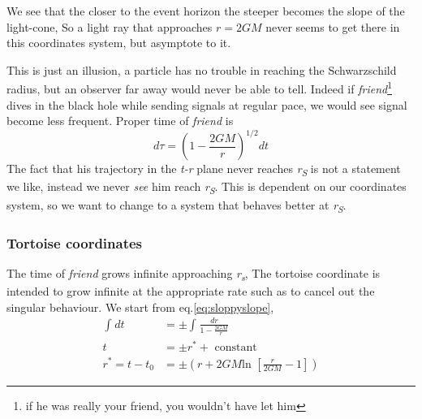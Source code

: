 \bigskip


We see that the closer to the event horizon the steeper becomes the slope of the light-cone, So a light ray that approaches $r=2GM$ never seems to get there in this coordinates system, but asymptote to it. \par
This is just an illusion, a particle has no trouble in reaching the Schwarzschild radius, but an observer far away would never be able to tell. Indeed if \emph{friend}\footnote{if he was really your friend, you wouldn't have let him} dives in the black hole while sending signals at regular pace, we would see signal become less frequent. Proper time of \emph{friend} is
\[
d\tau = \left( 1 - \frac{2GM}{r} \right)^{1/2}dt
\]
The fact that his trajectory in the \emph{t-r} plane never reaches \emph{r\textsubscript{S}} is not a statement we like, instead we never \emph{see} him reach \emph{r\textsubscript{S}}. This is dependent on our coordinates system, so we want to change to a system that behaves better at \emph{r\textsubscript{S}}.
\subsubsection{Tortoise coordinates}
The time of \emph{friend} grows infinite approaching \emph{r\textsubscript{s}}, The tortoise coordinate is intended to grow infinite at the appropriate rate such as to cancel out the singular behaviour. 
We start from eq.\ref{eq:sloppyslope},
\begin{align}
	\int_{}^{}{dt} &= \pm \int_{}^{}{ \frac{dr}{ 1 - \frac{2GM}{r}}}\\
	t &= \pm r^{*} + \text{ constant } \\
	r^{*} =  t-t_{0} &= \pm \left( r + 2GM \text{ln } \left[ \frac{r}{2GM} -1 \right] \right)
\end{align}

